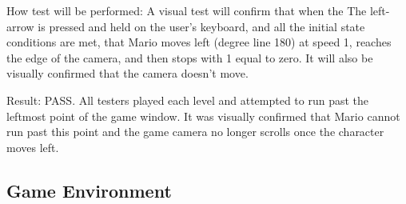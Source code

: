 \documentclass[12pt, titlepage]{article}
\begin{document}
\begin{enumerate}
How test will be performed: A visual test will confirm that when the The left-arrow is pressed and held on the user's keyboard, and all the initial state conditions are met, that Mario moves left (degree line 180) at speed 1, reaches the edge of the camera, and then stops with 1 equal to zero. It will also be visually confirmed that the camera doesn't move.

Result: PASS. All testers played each level and attempted to run past the leftmost point of the game window. It was visually confirmed that Mario cannot run past this point and the game camera no longer scrolls once the character moves left.
\end{enumerate}

\subsection{Game Environment}
\end{document}
